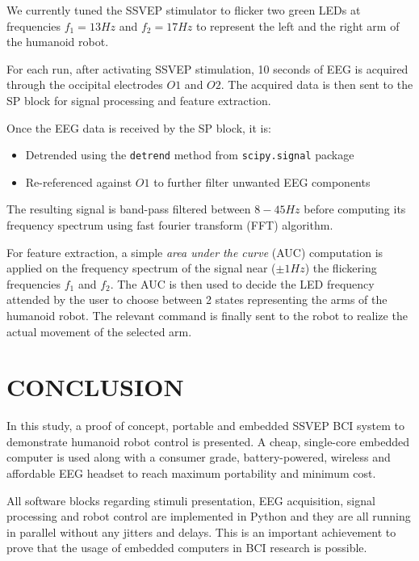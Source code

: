 \documentclass[12pt]{article}
\newcommand\mysection[1]{\vspace*{-0.35cm}\section{#1}\vspace*{6pt}\thispagestyle{empty}}
\newcommand\mysubsection[1]{\subsection{#1}}
\numberwithin{equation}{section}
\numberwithin{figure}{section}
\numberwithin{table}{section}
\begin{document}
\par{
    We currently tuned the SSVEP stimulator to flicker two green LEDs at
    frequencies $f_1=13Hz$ and $f_2=17Hz$ to represent the left and the right
    arm of the humanoid robot.
}
\par{
    For each run, after activating SSVEP stimulation, 10 seconds of EEG is acquired through the occipital electrodes
    $O1$ and $O2$. The acquired data is then sent to the SP block for signal processing
    and feature extraction.
}
\par{
    Once the EEG data is received by the SP block, it is:
    \begin{itemize}
        \item Detrended using the \texttt{detrend} method from \texttt{scipy.signal} package
        \item Re-referenced against $O1$ to further filter unwanted EEG components
    \end{itemize}
    The resulting signal is band-pass filtered between $8-45Hz$ before computing
    its frequency spectrum using fast fourier transform (FFT) algorithm.
}
\par{
    For feature extraction, a simple \emph{area under the curve} (AUC) computation is applied on the
    frequency spectrum of the signal near ($\pm1Hz$) the flickering frequencies $f_1$ and $f_2$.
    The AUC is then used to decide the LED frequency attended by the user to
    choose between 2 states representing the arms of the humanoid robot.
    The relevant command is finally sent to the robot to realize the actual
    movement of the selected arm.
}

\clearpage
\vspace*{-0.35cm}
\mysection{CONCLUSION}
\par{
    In this study, a proof of concept, portable and embedded SSVEP BCI system to demonstrate
    humanoid robot control is presented. A cheap, single-core embedded computer is used
    along with a consumer grade, battery-powered, wireless and affordable EEG headset
    to reach maximum portability and minimum cost.
}
\par{
    All software blocks regarding stimuli presentation,
    EEG acquisition, signal processing and robot control are implemented in Python and
    they are all running in parallel without any jitters and delays. This is
    an important achievement to prove that the usage of embedded computers in BCI
    research is possible.
}
\end{document}
